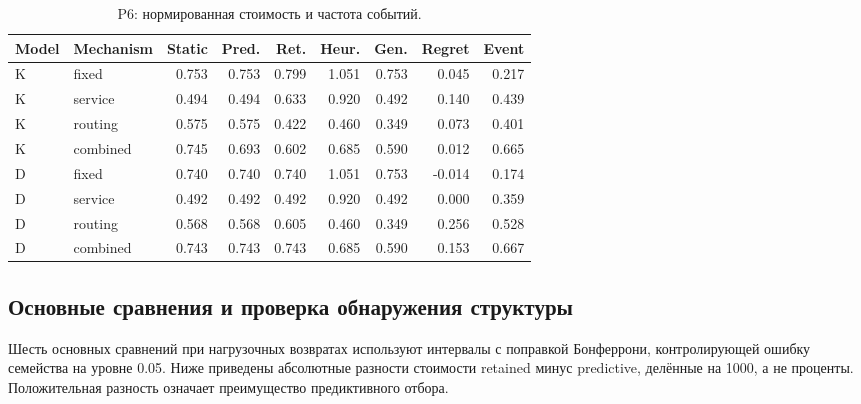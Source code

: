 \begin{table}[htbp]\caption{P6: нормированная стоимость и частота событий.}\centering\small\setlength{\tabcolsep}{3pt}

\begin{tabular}{llrrrrrrr}\toprule

Model & Mechanism & Static & Pred. & Ret. & Heur. & Gen. & Regret & Event\\\midrule

K & fixed & 0.753 & 0.753 & 0.799 & 1.051 & 0.753 & 0.045 & 0.217\\

K & service & 0.494 & 0.494 & 0.633 & 0.920 & 0.492 & 0.140 & 0.439\\

K & routing & 0.575 & 0.575 & 0.422 & 0.460 & 0.349 & 0.073 & 0.401\\

K & combined & 0.745 & 0.693 & 0.602 & 0.685 & 0.590 & 0.012 & 0.665\\

D & fixed & 0.740 & 0.740 & 0.740 & 1.051 & 0.753 & -0.014 & 0.174\\

D & service & 0.492 & 0.492 & 0.492 & 0.920 & 0.492 & 0.000 & 0.359\\

D & routing & 0.568 & 0.568 & 0.605 & 0.460 & 0.349 & 0.256 & 0.528\\

D & combined & 0.743 & 0.743 & 0.743 & 0.685 & 0.590 & 0.153 & 0.667\\

\bottomrule\end{tabular}\end{table}

\clearpage

\subsection{Основные сравнения и проверка обнаружения структуры}

Шесть основных сравнений при нагрузочных возвратах используют интервалы с поправкой Бонферрони, контролирующей ошибку семейства на уровне 0.05. Ниже приведены абсолютные разности стоимости retained минус predictive, делённые на 1000, а не проценты. Положительная разность означает преимущество предиктивного отбора.

